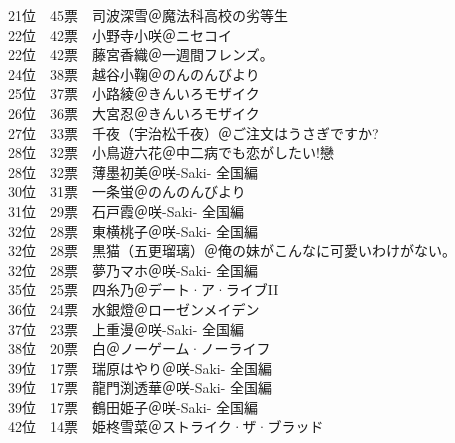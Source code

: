 {    21位　45票　司波深雪＠魔法科高校の劣等生                                \\
    22位　42票　小野寺小咲＠ニセコイ                                        \\
    22位　42票　藤宮香織＠一週間フレンズ。                                  \\
    24位　38票　越谷小鞠＠のんのんびより                                    \\
    25位　37票　小路綾＠きんいろモザイク                                    \\
    26位　36票　大宮忍＠きんいろモザイク                                    \\
    27位　33票　千夜（宇治松千夜）＠ご注文はうさぎですか?                   \\
    28位　32票　小鳥遊六花＠中二病でも恋がしたい!戀                         \\
    28位　32票　薄墨初美＠咲-Saki- 全国編                                   \\
    30位　31票　一条蛍＠のんのんびより                                      \\
    31位　29票　石戸霞＠咲-Saki- 全国編                                     \\
    32位　28票　東横桃子＠咲-Saki- 全国編                                   \\
    32位　28票　黒猫（五更瑠璃）＠俺の妹がこんなに可愛いわけがない。        \\
    32位　28票　夢乃マホ＠咲-Saki- 全国編                                   \\
    35位　25票　四糸乃＠デート·ア·ライブII                                \\
    36位　24票　水銀燈＠ローゼンメイデン                                    \\
    37位　23票　上重漫＠咲-Saki- 全国編                                     \\
    38位　20票　白＠ノーゲーム·ノーライフ                                  \\
    39位　17票　瑞原はやり＠咲-Saki- 全国編                                 \\
    39位　17票　龍門渕透華＠咲-Saki- 全国編                                 \\
    39位　17票　鶴田姫子＠咲-Saki- 全国編                                   \\
    42位　14票　姫柊雪菜＠ストライク·ザ·ブラッド                          \\
}
